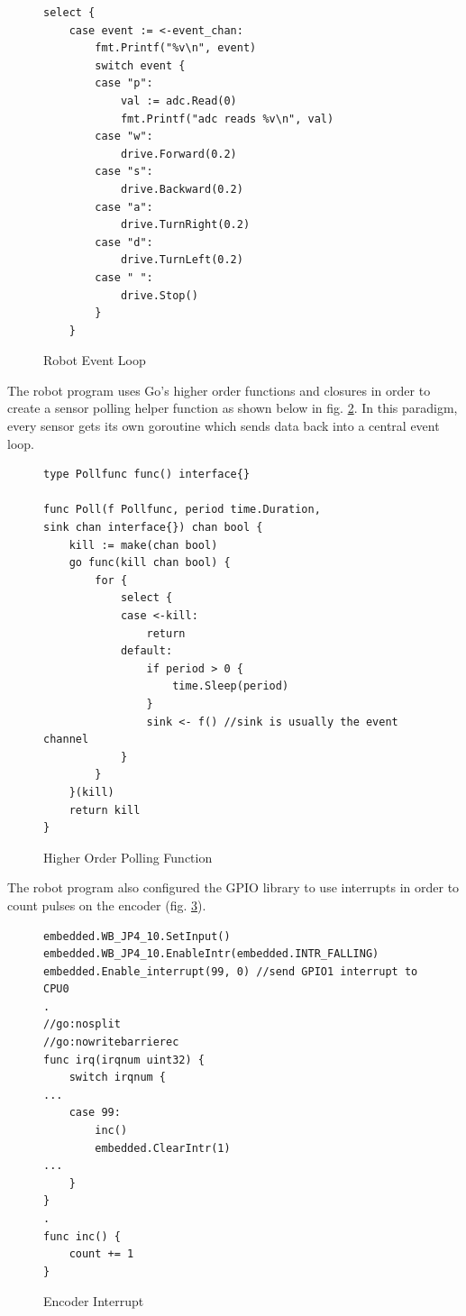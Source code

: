 \begin{figure}[h]
  \begin{center}
\begin{lstlisting}
select {
	case event := <-event_chan:
		fmt.Printf("%v\n", event)
		switch event {
		case "p":
			val := adc.Read(0)
			fmt.Printf("adc reads %v\n", val)
		case "w":
			drive.Forward(0.2)
		case "s":
			drive.Backward(0.2)
		case "a":
			drive.TurnRight(0.2)
		case "d":
			drive.TurnLeft(0.2)
		case " ":
			drive.Stop()
		}
	}
\end{lstlisting}
\end{center}
  \caption{Robot Event Loop} \label{fig:event_loop}
\end{figure}

The robot program uses Go's higher order functions and closures in order to create a sensor polling helper function
as shown below in fig. \ref{fig:poll_func}. In this paradigm, every sensor gets its own goroutine which sends
data back into a central event loop.


\begin{figure}[!h]
\begin{center}
\begin{lstlisting}
type Pollfunc func() interface{}

func Poll(f Pollfunc, period time.Duration,
sink chan interface{}) chan bool {
	kill := make(chan bool)
	go func(kill chan bool) {
		for {
			select {
			case <-kill:
				return
			default:
				if period > 0 {
					time.Sleep(period)
				}
				sink <- f() //sink is usually the event channel
			}
		}
	}(kill)
	return kill
}
\end{lstlisting}
\end{center}
  \caption{Higher Order Polling Function} \label{fig:poll_func}
\end{figure}

The robot program also configured the GPIO library to use interrupts in order to count pulses on the encoder (fig. \ref{fig:encoder}).

\begin{figure}[!h]
\begin{center}
\begin{lstlisting}
embedded.WB_JP4_10.SetInput()
embedded.WB_JP4_10.EnableIntr(embedded.INTR_FALLING)
embedded.Enable_interrupt(99, 0) //send GPIO1 interrupt to CPU0
.
//go:nosplit
//go:nowritebarrierec
func irq(irqnum uint32) {
	switch irqnum {
...
	case 99:
		inc()
		embedded.ClearIntr(1)
...
	}
}
.
func inc() {
	count += 1
}

\end{lstlisting}
\end{center}
  \caption{Encoder Interrupt} \label{fig:encoder}
\end{figure}

